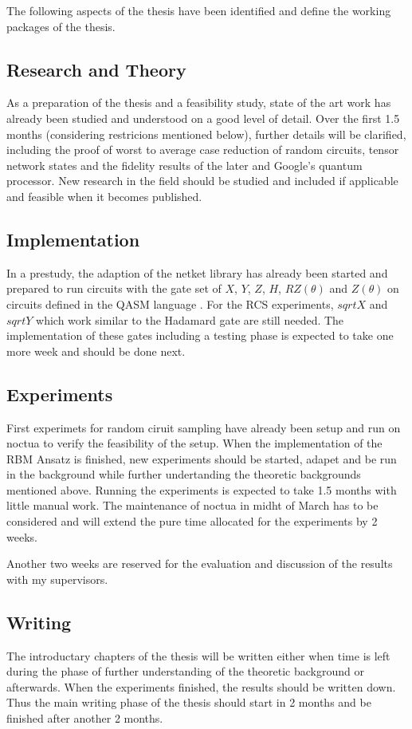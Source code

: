 The following aspects of the thesis have been identified and define the working packages of the thesis.

\subsection{Research and Theory}
As a preparation of the thesis and a feasibility study, state of the art work has already been studied 
and understood on a good level of detail. Over the first 1.5 months (considering restricions mentioned below), further details will be clarified, including 
the proof of worst to average case reduction of random circuits, tensor network states and the fidelity results 
of the later and Google's quantum processor. New research in the field should be studied and included if applicable and feasible when it becomes published.

\subsection{Implementation}
In a prestudy, the adaption of the netket library has already been started and prepared to run circuits with 
the gate set of $X$, $Y$, $Z$, $H$, $RZ(\theta)$ and $Z(\theta)$ on circuits defined in the QASM language \cite{cross2017open}. For the RCS experiments, $sqrtX$ and $sqrtY$ which work similar to the Hadamard gate are still 
needed. The implementation of these gates including a testing phase is expected to take one more week and should
be done next.

\subsection{Experiments}
First experimets for random ciruit sampling have already been setup and run on noctua to verify the feasibility of
the setup. When the implementation of the RBM Ansatz is finished, new experiments should be started, adapet and be run in the 
background while further undertanding the theoretic backgrounds mentioned above. Running the experiments is expected 
to take 1.5 months with little manual work. The maintenance of noctua in midht of March has to be considered
and will extend the pure time allocated for the experiments by 2 weeks.

Another two weeks are reserved for the evaluation and discussion of the results with my supervisors.

\subsection{Writing}
The introductary chapters of the thesis will be written either when time is left during the phase of further 
understanding of the theoretic background or afterwards. When the experiments finished, the results should be written
down. Thus the main writing phase of the thesis should start in 2 months and be finished after another 2 months.

